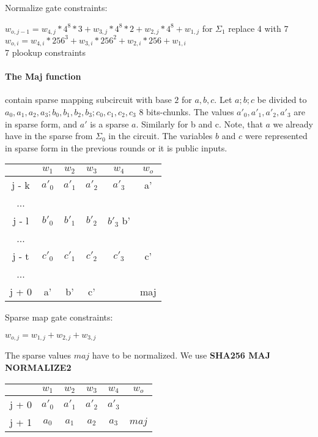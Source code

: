 Normalize gate constraints:
\begin{center}
$w_{o,j-1} = w_{4,j} * 4^8*3 + w_{3,j}*4^8*2 + w_{2,j}*4^8 + w_{1,j}$ for $\Sigma_1$ replace 4 with 7\\
$w_{o,i} = w_{4,i}*256^3 + w_{3,i}* 256^2 + w_{2,i} * 256 + w_{1,i}$ \\
7 plookup constraints \\
\end{center}

\paragraph{The Maj function}
contain sparse mapping subcircuit with base $2$ for $a, b ,c$.
Let $a; b; c$ be divided to $a_0, a_1, a_2, a_3; b_0, b_1, b_2, b_3; c_0, c_1, c_2, c_3$ 8 bits-chunks.
The values $a'_0, a'_1, a'_2, a'_3$ are in sparse form, and $a'$ is a sparse $a$.
Similarly for b and c. 
Note, that $a$ we already have in the sparse from $\Sigma_0$ in the circuit. 
The variables $b$ and $c$ were represented in sparse form in the previous rounds or it is public inputs.
\begin{center}
\begin{tabular}{ |c|c|c|c|c|c } 
  & $w_1$ & $w_2$ & $w_3$ & $w_4$ & $w_o$\\ 
 \hline 
j - k & $a'_0$ & $a'_1$ & $a'_2$ & $a'_3$ & a' \\ 
... & & & & \\
j - l & $b'_0$ & $b'_1$ & $b'_2$ & $b'_3$ b'&\\ 
... & & & & \\
j - t & $c'_0$ & $c'_1$ & $c'_2$ & $c'_3$ & c' \\ 
... & & & & \\
j + 0 & a' & b' & c' & & maj \\

 \hline
\end{tabular}
\end{center}
Sparse map gate constraints:
\begin{center}
$w_{o, j} = w_{1,j} + w_{2, j} + w_{3, j}$ \\
\end{center}

The sparse values $maj$ have to be normalized.
We use \textbf{SHA256 MAJ NORMALIZE2}
\begin{center}
\begin{tabular}{ |c|c|c|c|c|c|} 
  & $w_1$ & $w_2$ & $w_3$ & $w_4$ & $w_o$\\ 
 \hline
j + 0 & $a'_0$ & $a'_1$ & $a'_2$ & $a'_3$ &\\ 
j + 1 & $a_0$ & $ a_1$ & $a_2$ & $a_3$ &  $maj$ \\ 
 \hline
\end{tabular}
\end{center}

